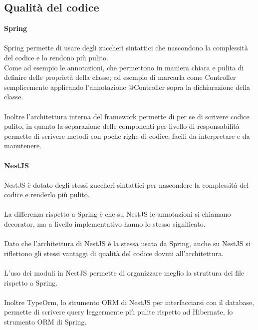\subsection{Qualità del codice}
\textbf{Spring}
\\\\
Spring permette di usare degli zuccheri sintattici che nascondono la complessità del codice e lo rendono più
pulito.
\\
Come ad esempio le annotazioni, che permettono in maniera chiara e pulita di definire delle proprietà della classe;
ad esempio di marcarla come Controller semplicemente applicando l'annotazione @Controller sopra la dichiarazione della
classe.
\\\\
Inoltre l'architettura interna del framework permette di per se di scrivere codice pulito, in quanto la separazione delle
componenti per livello di responsabilità permette di scrivere metodi con poche righe di codice, facili da interpretare e
da manutenere.
\\\\
\textbf{NestJS}
\\\\
NestJS è dotato degli stessi zuccheri sintattici per nascondere la complessità del codice e renderlo più pulito.
\\\\
La differenza rispetto a Spring è che su NestJS le annotazioni si chiamano decorator, ma a livello implementativo hanno lo 
stesso significato.
\\\\
Dato che l'architettura di NestJS è la stessa usata da Spring, anche su NestJS si riflettono gli stessi vantaggi di
qualità del codice dovuti all'architettura.
\\\\
L'uso dei moduli in NestJS permette di organizzare meglio la struttura dei file rispetto a Spring.
\\\\
Inoltre TypeOrm, lo strumento ORM di NestJS per interfacciarsi con il database, permette di scrivere query leggermente più
pulite rispetto ad Hibernate, lo strumento ORM di Spring.


